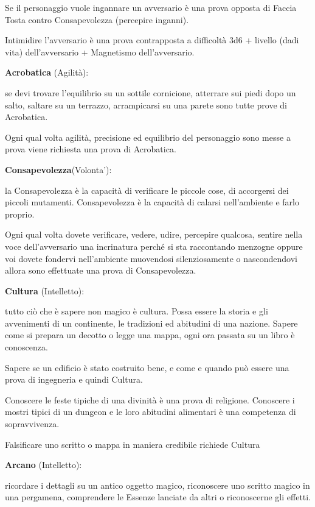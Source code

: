 \documentclass[a4paper,11pt,twoside,openany]{book}
\begin{document}
Se il personaggio vuole ingannare un avversario è una prova opposta di Faccia Tosta contro Consapevolezza (percepire inganni).

Intimidire l'avversario è una prova contrapposta a difficoltà 3d6 + livello (dadi vita) dell'avversario + Magnetismo dell'avversario.

\textbf{Acrobatica} (Agilità):

se devi trovare l'equilibrio su un sottile cornicione, atterrare sui piedi dopo un salto, saltare su un terrazzo, arrampicarsi su una parete sono tutte prove di Acrobatica.

Ogni qual volta agilità, precisione ed equilibrio del personaggio sono messe a prova viene richiesta una prova di Acrobatica.

\textbf{Consapevolezza}(Volonta'):

la Consapevolezza è la capacità di verificare le piccole cose, di accorgersi dei piccoli mutamenti. Consapevolezza è la capacità di calarsi nell'ambiente e farlo proprio.

Ogni qual volta dovete verificare, vedere, udire, percepire qualcosa, sentire nella voce dell'avversario una incrinatura perché si sta raccontando menzogne oppure voi dovete fondervi nell'ambiente muovendosi silenziosamente o nascondendovi allora sono effettuate una prova di Consapevolezza.

\textbf{Cultura} (Intelletto):

tutto ciò che è sapere non magico è cultura. Possa essere la storia e gli avvenimenti di un continente, le tradizioni ed abitudini di una nazione. Sapere come si prepara un decotto o legge una mappa, ogni ora passata su un libro è conoscenza.

Sapere se un edificio è stato costruito bene, e come e quando può essere una prova di ingegneria e quindi Cultura.

Conoscere le feste tipiche di una divinità è una prova di religione. Conoscere i mostri tipici di un dungeon e le loro abitudini alimentari è una competenza di sopravvivenza.

Falsificare uno scritto o mappa in maniera credibile richiede Cultura

\textbf{Arcano} (Intelletto):

ricordare i dettagli su un antico oggetto magico, riconoscere uno scritto magico in una pergamena, comprendere le Essenze lanciate da altri o riconoscerne gli effetti.
\end{document}
